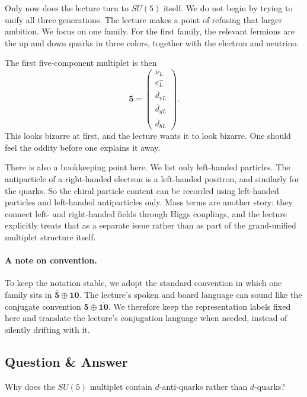 Only now does the lecture turn to \(SU(5)\) itself. We do not begin by trying to unify all three generations. The lecture makes a point of refusing that larger ambition. We focus on one family. For the first family, the relevant fermions are the up and down quarks in three colors, together with the electron and neutrino.

The first five-component multiplet is then
\begin{equation}
\overline{\mathbf 5}
=
\begin{pmatrix}
\nu_L\\
e^-_L\\
\bar d_{rL}\\
\bar d_{gL}\\
\bar d_{bL}
\end{pmatrix}.
\end{equation}
This looks bizarre at first, and the lecture wants it to look bizarre. One should feel the oddity before one explains it away.

There is also a bookkeeping point here. We list only left-handed particles. The antiparticle of a right-handed electron is a left-handed positron, and similarly for the quarks. So the chiral particle content can be recorded using left-handed particles and left-handed antiparticles only. Mass terms are another story: they connect left- and right-handed fields through Higgs couplings, and the lecture explicitly treats that as a separate issue rather than as part of the grand-unified multiplet structure itself.

\paragraph{A note on convention.}
To keep the notation stable, we adopt the standard convention in which one family sits in \(\overline{\mathbf 5}\oplus \mathbf{10}\). The lecture's spoken and board language can sound like the conjugate convention \(\mathbf 5\oplus \overline{\mathbf{10}}\). We therefore keep the representation labels fixed here and translate the lecture's conjugation language when needed, instead of silently drifting with it.

\subsection{Question \& Answer}

Why does the \(SU(5)\) multiplet contain \(d\)-anti-quarks rather than \(d\)-quarks?

